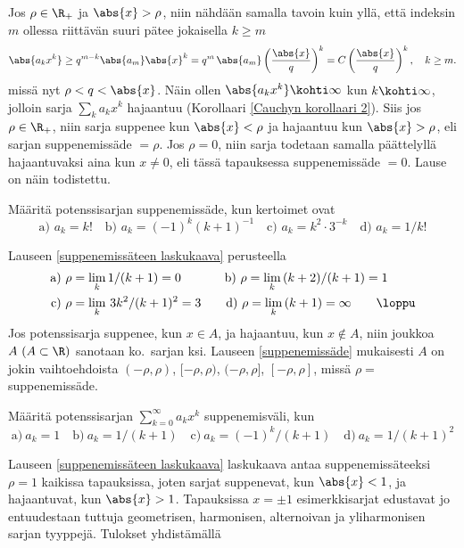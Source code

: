 Jos $\rho\in\R_+$ ja $\abs{x} > \rho$, niin nähdään samalla tavoin kuin yllä, että indeksin $m$
ollessa riittävän suuri pätee jokaisella $k \ge m$
\[
\abs{a_k x^k} \ge q^{m-k}\abs{a_m}\abs{x}^k = q^m\,\abs{a_m}\left(\frac{\abs{x}}{q}\right)^k 
                                            = C\left(\frac{\abs{x}}{q}\right)^k, \quad k \ge m.
\]
missä nyt $\rho < q < \abs{x}$. Näin ollen $\abs{a_k x^k}\kohti \infty$ kun $k \kohti \infty$, 
jolloin sarja $\sum_k a_k x^k$ hajaantuu (Korollaari \ref{Cauchyn korollaari 2}). Siis jos
$\rho \in \R_+$, niin sarja suppenee kun $\abs{x} < \rho$ ja hajaantuu kun $\abs{x} > \rho$,
eli sarjan suppenemissäde $= \rho$. Jos $\rho = 0$, niin sarja todetaan samalla päättelyllä
hajaantuvaksi aina kun $x \neq 0$, eli tässä tapauksessa suppenemissäde $= 0$. Lause on näin
todistettu. \loppu
\begin{Exa} Määritä potenssisarjan suppenemissäde, kun kertoimet ovat
\[
\text{a) } a_k=k! \quad \text{b) } a_k=(-1)^k (k+1)^{-1}\quad 
\text{c) } a_k=k^2\cdot 3^{-k} \quad \text{d) } a_k=1/k!
\]
\end{Exa}
\ratk Lauseen \ref{suppenemissäteen laskukaava} perusteella
\begin{align*}
\text{a) } \rho &= \lim_k 1/(k+1) = 0 \qquad\quad\,\   
\text{b) } \rho = \lim_k\,(k+2)/(k+1) = 1 \\
\text{c) } \rho &= \lim_k\,3k^2/(k+1)^2 = 3 \qquad     
\text{d) } \rho = \lim_k\,(k+1) = \infty \qquad\loppu
\end{align*}
Jos potenssisarja suppenee, kun $x \in A$, ja hajaantuu, kun $x \not\in A$, niin joukkoa 
$A\ (A\subset\R)$ sanotaan ko.\ sarjan
ksi. Lauseen \ref{suppenemissäde}
mukaisesti $A$ on jokin vaihtoehdoista $(-\rho,\rho)$, $[-\rho,\rho)$, $(-\rho,\rho]$, 
$[-\rho,\rho]$, missä $\rho=$ suppenemissäde. 
\begin{Exa} \label{suppenemisvälejä} Määritä potenssisarjan  $\sum_{k=0}^\infty a_k x^k$ 
suppenemisväli, kun 
\[
\text{a)}\ a_k = 1 \quad \text{b)}\ a_k = 1/(k+1) \quad 
\text{c)}\ a_k = (-1)^k/(k+1) \quad \text{d)}\ a_k = 1/(k+1)^2
\]
\end{Exa}
\ratk Lauseen \ref{suppenemissäteen laskukaava} laskukaava antaa suppenemissäteeksi $\rho = 1$
kaikissa tapauksissa, joten sarjat suppenevat, kun $\abs{x} < 1$, ja hajaantuvat, kun 
$\abs{x} > 1$. Tapauksissa $x = \pm 1$ esimerkkisarjat edustavat jo entuudestaan tuttuja 
geometrisen, harmonisen, alternoivan ja yliharmonisen sarjan tyyppejä. Tulokset yhdistämällä 
